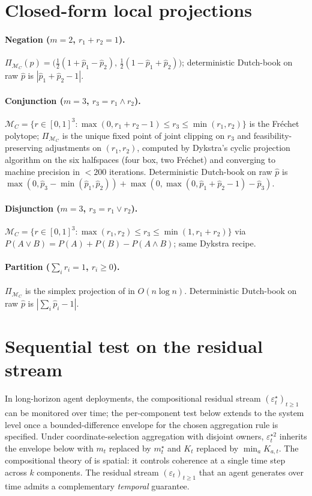 \documentclass{article}
\theoremstyle{plain}
\theoremstyle{definition}
\theoremstyle{remark}
\newcommand{\MC}{\mathcal{M}_C}
\newcommand{\hpK}{\hat p}
\newcommand{\eps}{\varepsilon}
\begin{document}
\section{Closed-form local projections}
\label{app:size3}

\paragraph{Negation ($m{=}2$, $r_1 + r_2 = 1$).}
$\Pi_{\MC}(\hpK) = \bigl(\tfrac{1}{2}(1 + \hat p_1 - \hat p_2),\,
\tfrac{1}{2}(1 - \hat p_1 + \hat p_2)\bigr)$;
deterministic Dutch-book on raw $\hpK$ is $|\hat p_1 + \hat p_2 - 1|$.

\paragraph{Conjunction ($m{=}3$, $r_3{=}r_1\!\wedge\!r_2$).}
$\MC = \{r\in[0,1]^3 : \max(0, r_1{+}r_2{-}1) \le r_3 \le \min(r_1, r_2)\}$
is the Fr\'echet polytope; $\Pi_{\MC}$ is the unique fixed point of
joint clipping on $r_3$ and feasibility-preserving adjustments on
$(r_1, r_2)$, computed by Dykstra's cyclic projection algorithm
\citep{boyle1986dykstra} on the six halfspaces (four box, two
Fr\'echet) and converging to machine precision in $<\!200$
iterations. Deterministic Dutch-book on raw $\hpK$ is
$\max(0, \hat p_3 - \min(\hat p_1, \hat p_2)) +
\max(0, \max(0,\hat p_1{+}\hat p_2{-}1) - \hat p_3)$.

\paragraph{Disjunction ($m{=}3$, $r_3{=}r_1\!\vee\!r_2$).}
$\MC = \{r\!\in\![0,1]^3 : \max(r_1, r_2) \le r_3 \le \min(1, r_1{+}r_2)\}$
via $P(A{\vee}B) = P(A){+}P(B){-}P(A{\wedge}B)$; same Dykstra
recipe.

\paragraph{Partition ($\sum_i r_i = 1$, $r_i\ge 0$).}
$\Pi_{\MC}$ is the simplex projection of \citet{wang2013simplex}
in $O(n\log n)$. Deterministic Dutch-book on raw $\hpK$ is
$|\sum_i \hat p_i - 1|$.

\section{Sequential test on the residual stream}
\label{app:audit}

In long-horizon agent deployments, the compositional residual
stream $(\eps^\star_t)_{t \ge 1}$ can be monitored over time;
the per-component test below extends to the system level once a
bounded-difference envelope for the chosen aggregation rule is
specified. Under coordinate-selection aggregation with disjoint
owners, $\eps_t^{\star 2}$ inherits the envelope below with
$m_t$ replaced by $m^\star_t$ and $K_t$ replaced by
$\min_a K_{a,t}$. The compositional theory of  is
spatial: it controls coherence at a single time step across $k$
components. The residual stream $(\eps_t)_{t\ge 1}$ that an agent
generates over time admits a complementary \emph{temporal}
guarantee.
\end{document}
